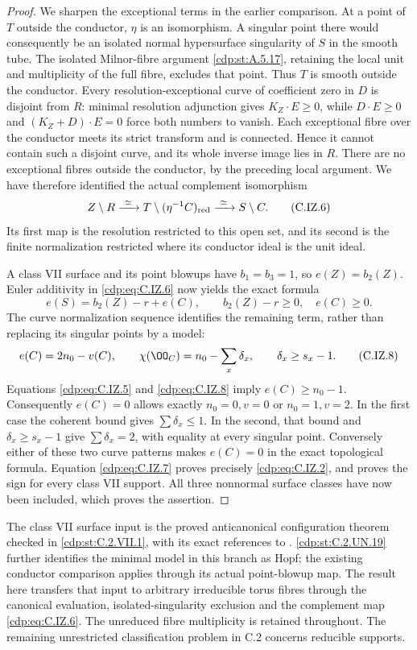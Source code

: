\begin{proof}
We sharpen the exceptional terms in the earlier comparison.
At a point of $T$ outside the conductor, $\eta$ is an
isomorphism. A singular point there would consequently be
an isolated normal hypersurface singularity of $S$ in
the smooth tube. The isolated Milnor-fibre argument
\ref{cdp:st:A.5.17}, retaining the local unit and multiplicity of
the full fibre, excludes that point. Thus $T$ is smooth
outside the conductor. Every resolution-exceptional curve
of coefficient zero in $D$ is disjoint from $R$: minimal
resolution adjunction gives $K_Z\cdot E\ge0$, while
$D\cdot E\ge0$ and $(K_Z+D)\cdot E=0$ force both
numbers to vanish. Each exceptional fibre over the
conductor meets its strict transform and is connected.
Hence it cannot contain such a disjoint curve, and its
whole inverse image lies in $R$. There are no exceptional
fibres outside the conductor, by the preceding local
argument. We have therefore identified the actual
complement isomorphism
\[
 Z\setminus R\xrightarrow{\ \simeq\ }
 T\setminus(\eta^{-1}C)_{\rm red}
 \xrightarrow{\ \simeq\ }S\setminus C.                \tag{C.IZ.6}\label{cdp:eq:C.IZ.6}
\]
Its first map is the resolution restricted to this open
set, and its second is the finite normalization restricted
where its conductor ideal is the unit ideal.

A class VII surface and its point blowups have
$b_1=b_3=1$, so $e(Z)=b_2(Z)$. Euler additivity in
\eqref{cdp:eq:C.IZ.6} now yields the exact formula
\[
 e(S)=b_2(Z)-r+e(C),\qquad
 b_2(Z)-r\ge0,\quad e(C)\ge0.                           \tag{C.IZ.7}\label{cdp:eq:C.IZ.7}
\]
The curve normalization sequence identifies the remaining
term, rather than replacing its singular points by a
model:
\[
 e(C)=2n_0-v(C),\qquad
 \chi(\OO_C)=n_0-\sum_x\delta_x,\qquad
 \delta_x\ge s_x-1.                                    \tag{C.IZ.8}\label{cdp:eq:C.IZ.8}
\]
Equations \eqref{cdp:eq:C.IZ.5} and \eqref{cdp:eq:C.IZ.8} imply $e(C)\ge n_0-1$.
Consequently $e(C)=0$ allows exactly $n_0=0,v=0$ or
$n_0=1,v=2$. In the first case the coherent bound gives
$\sum\delta_x\le1$. In the second, that bound and
$\delta_x\ge s_x-1$ give $\sum\delta_x=2$, with equality
at every singular point. Conversely either of these
two curve patterns makes $e(C)=0$ in the exact
topological formula. Equation \eqref{cdp:eq:C.IZ.7} proves precisely
\eqref{cdp:eq:C.IZ.2}, and proves the sign for every class VII
support. All three nonnormal surface classes have now
been included, which proves the assertion.
\end{proof}

The class VII surface input is the proved anticanonical
configuration theorem checked in \ref{cdp:st:C.2.VII.1}, with its exact
references to \cite{Dloussky2006,DOT2003}. \ref{cdp:st:C.2.UN.19} further
identifies the minimal model in this branch as Hopf;
the existing conductor comparison applies through its
actual point-blowup map. The result here
transfers that input to arbitrary irreducible torus fibres
through the canonical evaluation, isolated-singularity
exclusion and the complement map \eqref{cdp:eq:C.IZ.6}. The unreduced
fibre multiplicity is retained throughout. The remaining
unrestricted classification problem in C.2 concerns
reducible supports.


